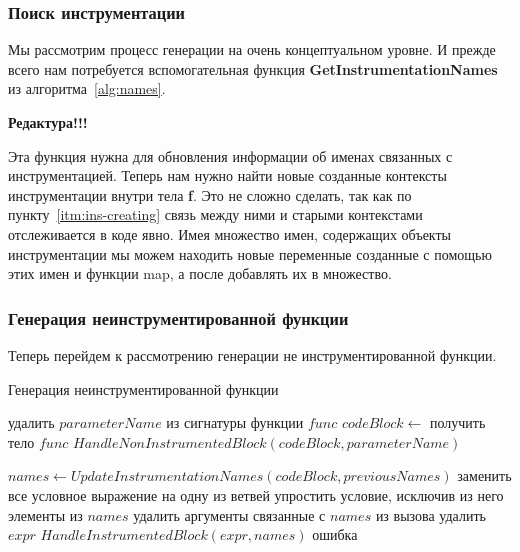 \subsubsection{Поиск инструментации}

Мы рассмотрим процесс генерации на очень концептуальном уровне.
И прежде всего нам потребуется вспомогательная функция
\textbf{GetInstrumentationNames} из алгоритма~\ref{alg:names}.

\textbf{Редактура!!!}

Эта функция нужна для обновления информации об именах связанных с инструментацией.
Теперь нам нужно найти новые созданные контексты инструментации внутри
тела \textbf{f}.
Это не сложно сделать, так как по пункту~\ref{itm:ins-creating} связь между ними
и старыми контекстами отслеживается в коде явно.
Имея множество имен, содержащих объекты инструментации мы можем находить новые
переменные созданные с помощью этих имен и функции map, а после добавлять их в
множество.

\subsubsection{Генерация неинструментированной функции}

Теперь перейдем к рассмотрению генерации не инструментированной функции.

\begin{algorithm}
\caption{Генерация неинструментированной функции}\label{alg:nonins}
\begin{algorithmic}[1]
  \State удалить $parameterName$ из сигнатуры функции $func$
  \State $codeBlock \gets$ получить тело $func$
  \State $HandleNonInstrumentedBlock(codeBlock, parameterName)$
\EndFunction

  \State $names \gets UpdateInstrumentationNames(codeBlock, previousNames)$
      \State заменить все условное выражение на одну из ветвей
      \State упростить условие, исключив из него элементы из $names$
      \State удалить аргументы связанные с $names$ из вызова
      \State удалить $expr$
      \State $HandleInstrumentedBlock(expr, names)$
      \State \Return ошибка
    \EndIf
  \EndFor
\EndFunction
\end{algorithmic}
\end{algorithm}


